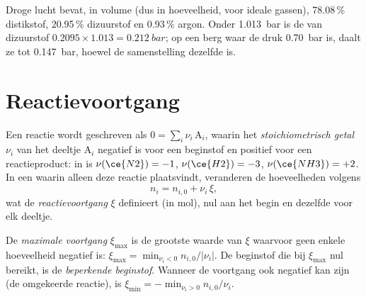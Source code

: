 \begin{example}[Lucht]\label{ex:b1:extent-q-and-k:air}
Droge lucht bevat, in volume (dus in hoeveelheid, voor ideale gassen),
78.08\,\% distikstof, 20.95\,\% dizuurstof en 0.93\,\% argon. Onder
\qty{1.013}{bar} is de  van dizuurstof $0.2095 \times
1.013 = \qty{0.212}{bar}$; op een berg waar de druk \qty{0.70}{bar} is,
daalt ze tot \qty{0.147}{bar}, hoewel de samenstelling dezelfde is.
\end{example}


\section{Reactievoortgang}

\begin{definition}\label{def:b1:extent-q-and-k:extent}
Een reactie wordt geschreven als $0 = \sum_i \nu_i\,\mathrm{A}_i$, waarin
het \emph{stoichiometrisch getal} $\nu_i$
van het deeltje $\mathrm{A}_i$ negatief is voor een beginstof en positief
voor een reactieproduct: in  is $\nu(\ce{N2}) = -1$,
$\nu(\ce{H2}) = -3$,
$\nu(\ce{NH3}) = +2$. In een  waarin alleen deze reactie
plaatsvindt, veranderen de hoeveelheden volgens
\[
  n_i = n_{i,0} + \nu_i\,\xi ,
\]
wat de \emph{reactievoortgang} $\xi$ definieert
(in mol), nul aan het begin en dezelfde voor elk deeltje.
\end{definition}

\begin{definition}\label{def:b1:extent-q-and-k:max-extent}
De \emph{maximale voortgang} $\xi_{\max}$ is de
grootste waarde van $\xi$ waarvoor geen enkele hoeveelheid negatief is:
$\xi_{\max} = \min_{\nu_i <
0} n_{i,0}/|\nu_i|$. De beginstof die bij $\xi_{\max}$ nul bereikt, is de
\emph{beperkende beginstof}. Wanneer de
voortgang ook negatief kan zijn (de omgekeerde reactie), is
$\xi_{\min} = -\min_{\nu_i > 0}
n_{i,0}/\nu_i$.
\end{definition}

